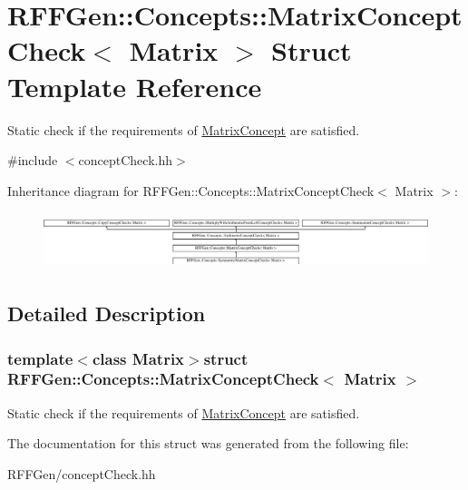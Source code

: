 \hypertarget{structRFFGen_1_1Concepts_1_1MatrixConceptCheck}{\section{R\-F\-F\-Gen\-:\-:Concepts\-:\-:Matrix\-Concept\-Check$<$ Matrix $>$ Struct Template Reference}
\label{structRFFGen_1_1Concepts_1_1MatrixConceptCheck}
}


Static check if the requirements of \hyperlink{structRFFGen_1_1Concepts_1_1MatrixConcept}{Matrix\-Concept} are satisfied.  




{\ttfamily \#include $<$concept\-Check.\-hh$>$}

Inheritance diagram for R\-F\-F\-Gen\-:\-:Concepts\-:\-:Matrix\-Concept\-Check$<$ Matrix $>$\-:\begin{figure}[H]
\begin{center}
\leavevmode
\includegraphics[height=1.666667cm]{structRFFGen_1_1Concepts_1_1MatrixConceptCheck}
\end{center}
\end{figure}


\subsection{Detailed Description}
\subsubsection*{template$<$class Matrix$>$struct R\-F\-F\-Gen\-::\-Concepts\-::\-Matrix\-Concept\-Check$<$ Matrix $>$}

Static check if the requirements of \hyperlink{structRFFGen_1_1Concepts_1_1MatrixConcept}{Matrix\-Concept} are satisfied. 

The documentation for this struct was generated from the following file\-:\begin{DoxyCompactItemize}
\item 
R\-F\-F\-Gen/concept\-Check.\-hh\end{DoxyCompactItemize}
